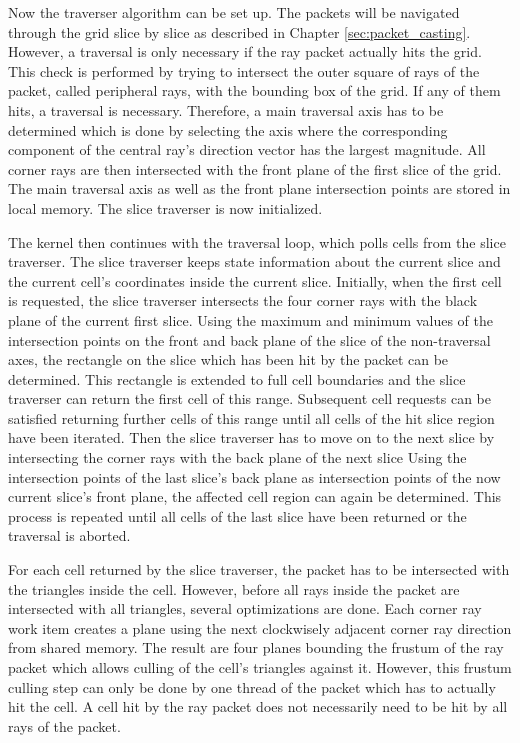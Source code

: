 Now the traverser algorithm can be set up. The packets will be navigated through the grid slice by slice as described in Chapter \ref{sec:packet_casting}. However, a traversal is only necessary if the ray packet actually hits the grid. This check is performed by trying to intersect the outer square of rays of the packet, called peripheral rays, with the bounding box of the grid. If any of them hits, a traversal is necessary. Therefore, a main traversal axis has to be determined which is done by selecting the axis where the corresponding component of the central ray's direction vector has the largest magnitude. All corner rays are then intersected with the front plane of the first slice of the grid. The main traversal axis as well as the front plane intersection points are stored in local memory. The slice traverser is now initialized.

The kernel then continues with the traversal loop, which polls cells from the slice traverser. The slice traverser keeps state information about the current slice and the current cell's coordinates inside the current slice. Initially, when the first cell is requested, the slice traverser intersects the four corner rays with the black plane of the current first slice. Using the maximum and minimum values of the intersection points on the front and back plane of the slice of the non-traversal axes, the rectangle on the slice which has been hit by the packet can be determined. This rectangle is extended to full cell boundaries and the slice traverser can return the first cell of this range. Subsequent cell requests can be satisfied returning further cells of this range until all cells of the hit slice region have been iterated. Then the slice traverser has to move on to the next slice by intersecting the corner rays with the back plane of the next slice Using the intersection points of the last slice's back plane as intersection points of the now current slice's front plane, the affected cell region can again be determined. This process is repeated until all cells of the last slice have been returned or the traversal is aborted.

For each cell returned by the slice traverser, the packet has to be intersected with the triangles inside the cell. However, before all rays inside the packet are intersected with all triangles, several optimizations are done. Each corner ray work item creates a plane using the next clockwisely adjacent corner ray direction from shared memory. The result are four planes bounding the frustum of the ray packet which allows culling of the cell's triangles against it. However, this frustum culling step can only be done by one thread of the packet which has to actually hit the cell. A cell hit by the ray packet does not necessarily need to be hit by all rays of the packet.

